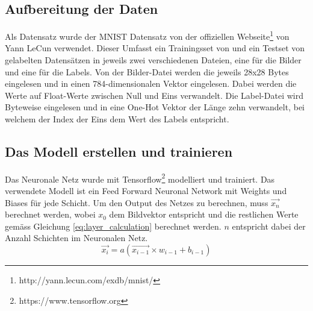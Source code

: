 \documentclass[Interploate_hadwritten_Digits.tex.tex]{subfiles}
\begin{document}
	\subsection{Aufbereitung der Daten}
	Als Datensatz wurde der MNIST Datensatz von der offiziellen Webseite\footnote{ http://yann.lecun.com/exdb/mnist/} von Yann LeCun verwendet. Dieser Umfasst ein Trainingsset von  und ein Testset von  gelabelten Datensätzen in jeweils zwei verschiedenen Dateien, eine für die Bilder und eine für die Labels. Von der Bilder-Datei werden die jeweils 28x28 Bytes eingelesen und in einen 784-dimensionalen Vektor eingelesen. Dabei werden die Werte auf Float-Werte zwischen Null und Eins verwandelt. Die Label-Datei wird Byteweise eingelesen und in eine One-Hot Vektor der Länge zehn verwandelt, bei welchem der Index der Eins dem Wert des Labels entspricht. 
	
	\subsection{Das Modell erstellen und trainieren}
	Das Neuronale Netz wurde mit Tensorflow\footnote{https://www.tensorflow.org} modelliert und trainiert. Das verwendete Modell ist ein Feed Forward Neuronal Network mit Weights und Biases für jede Schicht. Um den Output des Netzes zu berechnen, muss $ \vec{x_{n}} $ berechnet werden, wobei $ x_{0} $ dem Bildvektor entspricht und die restlichen Werte gemäss Gleichung \ref{eq:layer_calculation} berechnet werden. $ n $ entspricht dabei der Anzahl Schichten im Neuronalen Netz.
	\begin{equation}
	\vec{x_{i}} = a(\vec{x_{i-1}} \times w_{i-1} + b_{i-1})
	\label{eq:layer_calculation}
	\end{equation}
	
\end{document}
